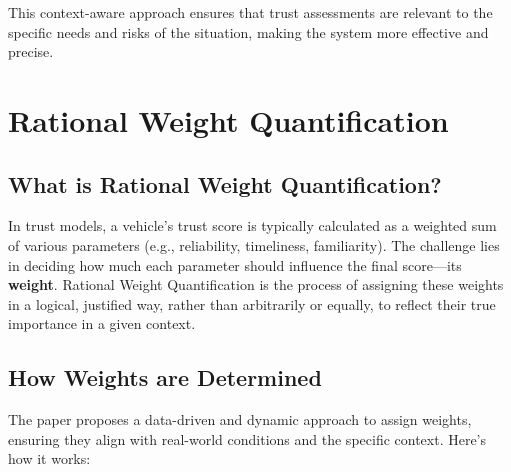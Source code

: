 \documentclass{article}
\begin{document}
This context-aware approach ensures that trust assessments are relevant to the specific needs and risks of the situation, making the system more effective and precise.

\section*{Rational Weight Quantification}

\subsection*{What is Rational Weight Quantification?}
In trust models, a vehicle’s trust score is typically calculated as a weighted sum of various parameters (e.g., reliability, timeliness, familiarity). The challenge lies in deciding how much each parameter should influence the final score—its \textbf{weight}. Rational Weight Quantification is the process of assigning these weights in a logical, justified way, rather than arbitrarily or equally, to reflect their true importance in a given context.

\subsection*{How Weights are Determined}
The paper proposes a data-driven and dynamic approach to assign weights, ensuring they align with real-world conditions and the specific context. Here’s how it works:
\end{document}

